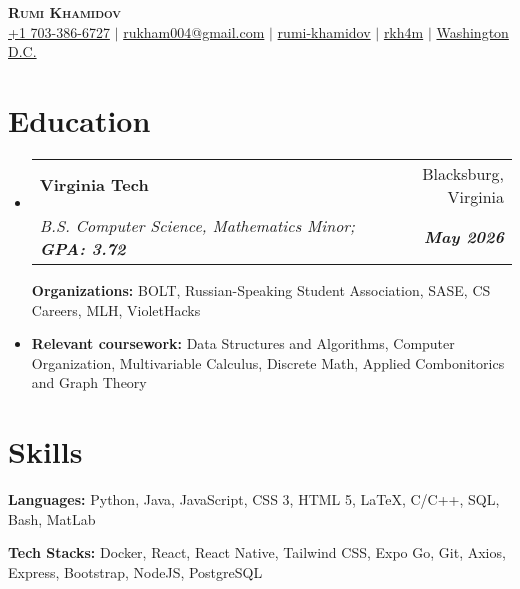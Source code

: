 \documentclass[letterpaper, 10pt]{article}
\makeatletter
\newcommand{\resumeItem}[1]{
  \item\small{
    {#1 \vspace{-2pt}}
  }
}
\newcommand{\resumeEducationHeading}[6]{
  \vspace{-2pt}\item
    \begin{tabular*}{0.97\textwidth}[t]{l@{\extracolsep{\fill}}r}
      \textbf{#1} & #2 \\
      \textit{\small#3} & \textit{\small #4} \\
    \end{tabular*}\vspace{-5pt}
}
\newcommand{\resumeSubHeadingListStart}{\begin{itemize}[leftmargin=0.15in, label={}]}
\newcommand{\resumeSubHeadingListEnd}{\end{itemize}}
\newcommand{\resumeItemListStart}{\begin{itemize}}
\newcommand{\resumeItemListEnd}{\end{itemize}\vspace{-5pt}}
\makeatother
\begin{document}

\begin{center}
    \textbf{\Huge \scshape Rumi Khamidov} \\ \vspace{3pt}
    \small
    \faMobile \hspace{.5pt} \href{tel:7033866727}{+1 703-386-6727}
    $|$
    \faAt \hspace{.5pt} \href{mailto:rukham004@gmail.com}{rukham004@gmail.com}
    $|$
    \faLinkedinSquare \hspace{.5pt} \href{https://www.linkedin.com/in/rumi-khamidov}{rumi-khamidov}
    $|$
    \faGithub \hspace{.5pt} \href{https://github.com/rkh4m}{rkh4m}
    $|$
    \faMapMarker \hspace{.5pt} \href{https://maps.app.goo.gl/aoi52DAKhQkgQ1MT8}{Washington D.C.}
\end{center}



\section{Education}
  \vspace{3pt}
  \resumeSubHeadingListStart
    
    \resumeEducationHeading
      {Virginia Tech
      }{Blacksburg, Virginia}
      {B.S. Computer Science, Mathematics Minor; \textbf{GPA: 3.72}}{\textbf{May 2026}}

        \resumeItemListStart
	   \resumeItem{\textbf{Organizations:} BOLT, Russian-Speaking Student Association, SASE, CS Careers, MLH, VioletHacks}
             \resumeItem{\textbf{Relevant coursework:}  Data Structures and Algorithms, Computer Organization, Multivariable Calculus, Discrete Math, Applied Combonitorics and Graph Theory}
         \resumeItemListEnd


\section{Skills}
  \vspace{2pt}
  \resumeSubHeadingListStart
    \small{\item{
        \textbf{Languages:}{ Python, Java, JavaScript, CSS 3, HTML 5, LaTeX, C/C++, SQL, Bash, MatLab } \\ \vspace{3pt}
                
        \textbf{Tech Stacks:}{ Docker, React, React Native, Tailwind CSS, Expo Go, Git, Axios, Express, Bootstrap, NodeJS, PostgreSQL } \\ \vspace{3pt}
    }}
  \resumeSubHeadingListEnd
\end{document}

